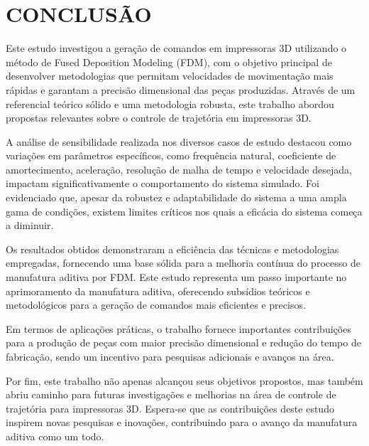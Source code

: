 \chapter{CONCLUSÃO}
Este estudo investigou a geração de comandos em impressoras 3D utilizando o método de Fused Deposition Modeling (FDM), com o objetivo principal de desenvolver metodologias que permitam velocidades de movimentação mais rápidas e garantam a precisão dimensional das peças produzidas. Através de um referencial teórico sólido e uma metodologia robusta, este trabalho abordou propostas relevantes sobre o controle de trajetória em impressoras 3D.

A análise de sensibilidade realizada nos diversos casos de estudo destacou como variações em parâmetros específicos, como frequência natural, coeficiente de amortecimento, aceleração, resolução de malha de tempo e velocidade desejada, impactam significativamente o comportamento do sistema simulado. Foi evidenciado que, apesar da robustez e adaptabilidade do sistema a uma ampla gama de condições, existem limites críticos nos quais a eficácia do sistema começa a diminuir. 

Os resultados obtidos demonstraram a eficiência das técnicas e metodologias empregadas, fornecendo uma base sólida para a melhoria contínua do processo de manufatura aditiva por FDM. Este estudo representa um passo importante no aprimoramento da manufatura aditiva, oferecendo subsídios teóricos e metodológicos para a geração de comandos mais eficientes e precisos.

Em termos de aplicações práticas, o trabalho fornece importantes contribuições para a produção de peças com maior precisão dimensional e redução do tempo de fabricação, sendo um incentivo para pesquisas adicionais e avanços na área.

Por fim, este trabalho não apenas alcançou seus objetivos propostos, mas também abriu caminho para futuras investigações e melhorias na área de controle de trajetória para impressoras 3D. Espera-se que as contribuições deste estudo inspirem novas pesquisas e inovações, contribuindo para o avanço da manufatura aditiva como um todo.
